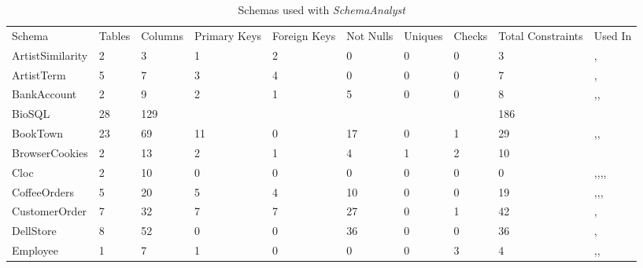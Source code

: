 \begin{table*}[t]
\footnotesize
\centering
\caption{Schemas used with \textit{SchemaAnalyst}}
\label{tab:schemas}
\begin{tabular}{llllllllll}
Schema & Tables & Columns & Primary Keys & Foreign Keys & Not Nulls & Uniques & Checks & Total Constraints & Used In \\
ArtistSimilarity & 2 & 3  &      1       &      2       &    0      &    0    &    0   & 3 & \cite{wright2014impact},\cite{mcminn2015effectiveness} \\
ArtistTerm & 5 & 7        &      3       &       4      &    0      &    0    &    0   & 7 &  \cite{wright2014impact},\cite{mcminn2015effectiveness} \\
BankAccount & 2 & 9       &        2     &         1    &       5   &   0     &    0   & 8 & \cite{kapfhammer2013search},\cite{wright2014impact},\cite{mcminn2015effectiveness} \\
BioSQL & 28 & 129         &              &              &           &         &        & 186 &\cite{kinneer2015automatically} \\
BookTown   & 23 & 69      &  11          &       0      &    17     &   0     &     1  & 29 & \cite{kapfhammer2013search},\cite{wright2014impact},\cite{mcminn2015effectiveness}  \\
BrowserCookies & 2 & 13   &       2      &     1        &    4      &     1   &    2   & 10 &  \cite{mcminn2015effectiveness} \\
Cloc       & 2  & 10      &           0  &      0       &    0      &     0   &   0    & 0  &   \cite{kapfhammer2013search},\cite{wright2013efficient},\cite{wright2014impact},\cite{mcminn2015effectiveness},\cite{kinneer2015automatically}  \\
CoffeeOrders & 5 & 20     &      5       &    4         &    10     &   0     &    0   & 19 & \cite{mcminn2016virtual},\cite{kapfhammer2013search},\cite{wright2014impact},\cite{mcminn2015effectiveness}\\
CustomerOrder & 7 & 32    &     7        &    7         &    27     &    0    &     1  & 42 &  \cite{kapfhammer2013search},\cite{mcminn2015effectiveness}  \\
DellStore  & 8 & 52       &        0     &   0          &  36       &    0    &    0   & 36 & \cite{kapfhammer2013search},\cite{mcminn2015effectiveness}  \\
Employee     & 1 &  7     &          1   & 0            &      0    &    0    &     3  & 4 & \cite{mcminn2016virtual},\cite{kapfhammer2013search},\cite{mcminn2015effectiveness} \\

\end{tabular}
\end{table*}

